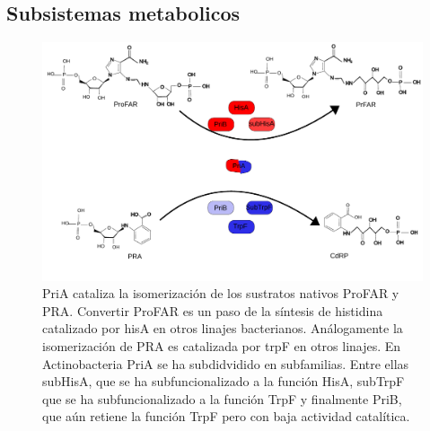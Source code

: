 \documentclass[12pt,twoside]{reedthesis}
\begin{document}
  \subsection{Subsistemas metabolicos}\label{subsistemas-metabolicos}
  
  \begin{figure}[h!tbp]
  \centering
  \includegraphics[angle = 0,scale = 0.6]{PriA.pdf}
  \caption[PriA isomeriza los sustratos PRA y ProFAR ]{\footnotesize{PriA cataliza la isomerización  de los sustratos nativos ProFAR y PRA. Convertir ProFAR es un paso de la síntesis de histidina catalizado por {hisA} en otros linajes bacterianos. Análogamente la isomerización de PRA es catalizada por {trpF} en otros linajes. En Actinobacteria PriA se ha subdidvidido en subfamilias. Entre ellas subHisA, que se ha subfuncionalizado a la función HisA, subTrpF que se ha subfuncionalizado a la función TrpF y finalmente PriB, que aún retiene la función TrpF pero con baja actividad catalítica.  }}
  \label{fig:priAFigure}
  \end{figure}
  
\end{document}
